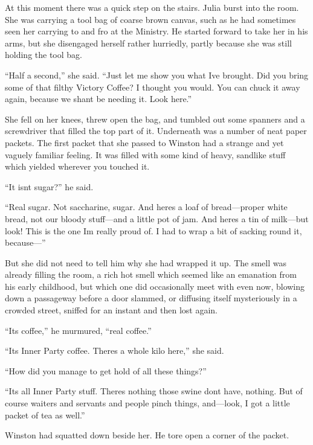 At this moment there was a quick step on the stairs. Julia burst into
the room. She was carrying a tool bag of coarse brown canvas, such as he
had sometimes seen her carrying to and fro at the Ministry. He started
forward to take her in his arms, but she disengaged herself rather
hurriedly, partly because she was still holding the tool bag.

``Half a second,'' she said. ``Just let me show you what
I\textquotesingle ve brought. Did you bring some of that filthy Victory
Coffee? I thought you would. You can chuck it away again, because we
shan\textquotesingle t be needing it. Look here.''

She fell on her knees, threw open the bag, and tumbled out some spanners
and a screwdriver that filled the top part of it. Underneath was a
number of neat paper packets. The first packet that she passed to
Winston had a strange and yet vaguely familiar feeling. It was filled
with some kind of heavy, sandlike stuff which yielded wherever you
touched it.

``It isn\textquotesingle t sugar?'' he said.

``Real sugar. Not saccharine, sugar. And here\textquotesingle s a loaf of
bread---proper white bread, not our bloody stuff---and a little pot of
jam. And here\textquotesingle s a tin of milk---but look! This is the
one I\textquotesingle m really proud of. I had to wrap a bit of sacking
round it, because---''

But she did not need to tell him why she had wrapped it up. The smell
was already filling the room, a rich hot smell which seemed like an
emanation from his early childhood, but which one did occasionally meet
with even now, blowing down a passageway before a door slammed, or
diffusing itself mysteriously in a crowded street, sniffed for an
instant and then lost again.

``It\textquotesingle s coffee,'' he murmured, ``real coffee.''

``It\textquotesingle s Inner Party coffee. There\textquotesingle s a
whole kilo here,'' she said.

``How did you manage to get hold of all these things?''

``It\textquotesingle s all Inner Party stuff. There\textquotesingle s
nothing those swine don\textquotesingle t have, nothing. But of course
waiters and servants and people pinch things, and---look, I got a little
packet of tea as well.''

Winston had squatted down beside her. He tore open a corner of the
packet.

